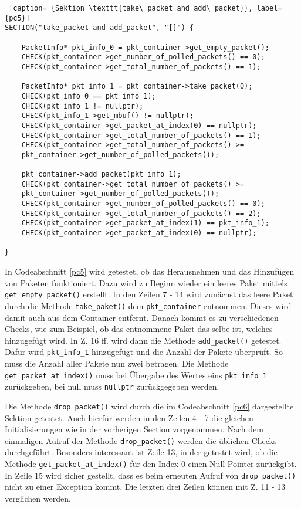 \documentclass[../review_3.tex]{subfiles}
\begin{document}
\begin{lstlisting} [caption= {Sektion \texttt{take\_packet and add\_packet}}, label={pc5}]
SECTION("take_packet and add_packet", "[]") {
    
    PacketInfo* pkt_info_0 = pkt_container->get_empty_packet();
    CHECK(pkt_container->get_number_of_polled_packets() == 0);
    CHECK(pkt_container->get_total_number_of_packets() == 1);
    
    PacketInfo* pkt_info_1 = pkt_container->take_packet(0);
    CHECK(pkt_info_0 == pkt_info_1);
    CHECK(pkt_info_1 != nullptr);
    CHECK(pkt_info_1->get_mbuf() != nullptr);
    CHECK(pkt_container->get_packet_at_index(0) == nullptr);
    CHECK(pkt_container->get_total_number_of_packets() == 1);
    CHECK(pkt_container->get_total_number_of_packets() >=
    pkt_container->get_number_of_polled_packets());
    
    pkt_container->add_packet(pkt_info_1);
    CHECK(pkt_container->get_total_number_of_packets() >=
    pkt_container->get_number_of_polled_packets());
    CHECK(pkt_container->get_number_of_polled_packets() == 0);
    CHECK(pkt_container->get_total_number_of_packets() == 2);
    CHECK(pkt_container->get_packet_at_index(1) == pkt_info_1);
    CHECK(pkt_container->get_packet_at_index(0) == nullptr);
    
}\end{lstlisting}

In Codeabschnitt \ref{pc5} wird getestet, ob das Herausnehmen und das Hinzufügen von Paketen funktioniert. Dazu wird zu Beginn wieder ein leeres Paket mittels \texttt{get\_empty\_packet()} erstellt. In den Zeilen 7 - 14 wird zunächst das leere Paket durch die Methode \texttt{take\_paket()} dem \texttt{pkt\_container} entnommen. Dieses wird damit auch aus dem Container entfernt. Danach kommt es zu verschiedenen Checks, wie zum Beispiel, ob das entnommene Paket das selbe ist, welches hinzugefügt wird. In Z. 16 ff. wird dann die Methode \texttt{add\_packet()} getestet. Dafür wird \texttt{pkt\_info\_1} hinzugefügt und die Anzahl der Pakete überprüft. So muss die Anzahl aller Pakete nun zwei betragen. Die Methode \texttt{get\_packet\_at\_index()} muss bei Übergabe des Wertes eins \texttt{pkt\_info\_1} zurückgeben, bei null muss \texttt{nullptr} zurückgegeben werden.

Die Methode \texttt{drop\_packet()} wird durch die im Codeabschnitt \ref{pc6} dargestellte Sektion getestet. Auch hierfür werden in den Zeilen 4 - 7 die gleichen Initialisierungen wie in der vorherigen Section vorgenommen. Nach dem einmaligen Aufruf der Methode \texttt{drop\_packet()} werden die üblichen Checks durchgeführt. Besonders interessant ist Zeile 13, in der getestet wird, ob die Methode \texttt{get\_packet\_at\_index()} für den Index 0 einen Null-Pointer zurückgibt. In Zeile 15 wird sicher gestellt, dass es beim erneuten Aufruf von \texttt{drop\_packet()} nicht zu einer Exception kommt. Die letzten drei Zeilen können mit Z. 11 - 13 verglichen werden.
\end{document}
